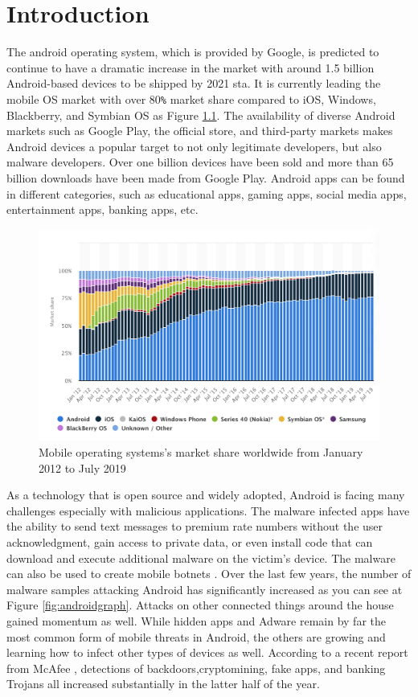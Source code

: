 \chapter{Introduction}

The android operating system, which is provided by Google, is predicted to continue to have a dramatic increase in the market with around 1.5 billion Android-based devices to be shipped by 2021 sta. It is currently leading the mobile OS market with over 80\verb+%+ market share compared to iOS, Windows, Blackberry, and Symbian OS as Figure \ref{fig:marketshare}. The availability of diverse Android markets such as Google Play, the official store, and third-party markets makes Android devices a popular target to not only legitimate developers, but also malware developers. Over one billion devices have been sold and more than 65 billion downloads have been made from Google Play. Android apps can be found in different categories, such as educational apps, gaming apps, social media apps, entertainment apps, banking apps, etc.

\begin{figure}[htbp]
    \centering
    \includegraphics[scale=0.5]{./Figure/marketshare.png}
    \caption{Mobile operating systems's market share worldwide from January 2012 to July 2019 \cite{androidshare}}
    \label{fig:marketshare}
  \end{figure}

As a technology that is open source and widely adopted, Android is facing many challenges especially with malicious applications. The malware infected apps have the ability to send text messages to premium rate numbers without the user acknowledgment, gain access to private data, or even install code that can download and execute additional malware on the victim’s device. The malware can also be used to create mobile botnets \cite{dl-droid}. Over the last few years, the number of malware samples attacking Android has significantly increased as you can see at Figure \ref{fig:androidgraph}. Attacks on other connected things around the house gained momentum as well. While hidden apps and Adware remain by far the most common form of mobile threats in Android, the others are growing and learning how to infect other types of devices as well. According to a recent report from McAfee \cite{mcafee}, detections of backdoors,cryptomining, fake apps, and banking Trojans all
increased substantially in the latter half of the year. 

